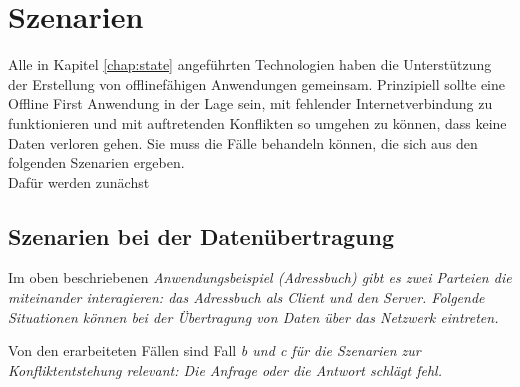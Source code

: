 \chapter{\label{chap:szenarien}Szenarien}
Alle in Kapitel \ref{chap:state} angeführten Technologien haben die Unterstützung der Erstellung von offlinefähigen Anwendungen gemeinsam.
Prinzipiell sollte eine Offline First Anwendung in der Lage sein, mit fehlender Internetverbindung zu funktionieren und mit auftretenden Konflikten so umgehen zu können, dass keine Daten verloren gehen.
Sie muss die Fälle behandeln können, die sich aus den folgenden Szenarien ergeben.\\
Dafür werden zunächst
%
%
%
\section{\label{sec:netszenarien}Szenarien bei der Datenübertragung}
Im oben beschriebenen \it{Anwendungsbeispiel} (Adressbuch) gibt es zwei Parteien die miteinander interagieren: das Adressbuch als Client und den Server. Folgende Situationen können bei der Übertragung von Daten über das Netzwerk eintreten.

Von den erarbeiteten Fällen sind Fall \it{b} und \it{c} für die Szenarien zur Konfliktentstehung relevant: Die Anfrage oder die Antwort schlägt fehl.
%
%
%
